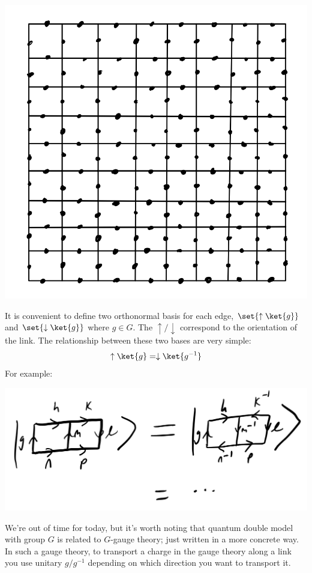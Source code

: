 \begin{center}
    \includegraphics[scale=0.35]{Lectures/Images/lec6-lattice.png}
\end{center}

It is convenient to define two orthonormal basis for each edge, $\set{\uparrow\ket{g}}$ and $\set{\downarrow\ket{g}}$ where $g \in G$. The $\uparrow/\downarrow$ correspond to the orientation of the link. The relationship between these two bases are very simple:
\begin{equation}
    \uparrow\ket{g} = \downarrow\ket{g^{-1}}
\end{equation}
For example:

\begin{center}
    \includegraphics[scale=0.35]{Lectures/Images/lec6-inverse.png}
\end{center}

We're out of time for today, but it's worth noting that quantum double model with group $G$ is related to $G$-gauge theory; just written in a more concrete way. In such a gauge theory, to transport a charge in the gauge theory along a link you use unitary $g/g^{-1}$ depending on which direction you want to transport it.
